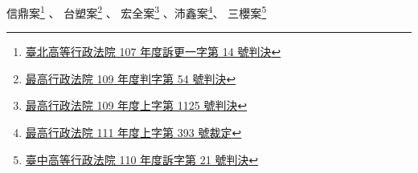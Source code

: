 信鼎案\footnote{\href{https://judgment.judicial.gov.tw/FJUD/data.aspx?ty=JD&id=TPBA\%2c107\%2c\%e8\%a8\%b4\%e6\%9b\%b4\%e4\%b8\%80\%2c14\%2c20191114\%2c1}{臺北高等行政法院 107 年度訴更一字第 14 號判決}} 、 
台塑案\footnote{\href{https://judgment.judicial.gov.tw/FJUD/data.aspx?ty=JD&id=TPAA\%2c109\%2c\%e5\%88\%a4\%2c54\%2c20200206\%2c1&ot=in}{最高行政法院 109 年度判字第 54 號判決}} 、
宏全案\footnote{\href{https://judgment.judicial.gov.tw/FJUD/data.aspx?ty=JD&id=TPAA\%2c109\%2c\%e4\%b8\%8a\%2c1125\%2c20221117\%2c1}{最高行政法院 109 年度上字第 1125 號判決}} 、沛鑫案\footnote{\href{https://judgment.judicial.gov.tw/FJUD/data.aspx?ty=JD&id=TPAA\%2c111\%2c\%e4\%b8\%8a\%2c393\%2c20220616\%2c1}{最高行政法院 111 年度上字第 393 號裁定}}、
三櫻案\footnote{\href{https://judgment.judicial.gov.tw/FJUD/data.aspx?ty=JD&id=TCBA\%2c110\%2c\%e8\%a8\%b4\%2c21\%2c20220830\%2c1&ot=in}{臺中高等行政法院 110 年度訴字第 21 號判決}}